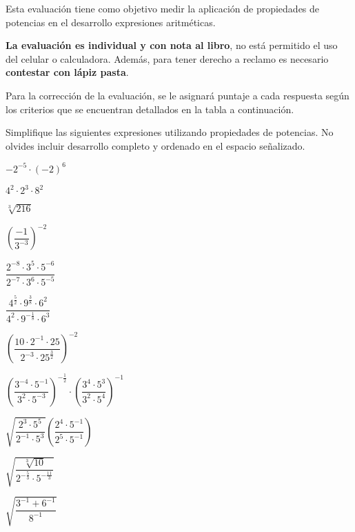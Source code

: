 \documentclass{caes}
\begin{document}
\datos
{}

Esta evaluación tiene como objetivo medir la aplicación de propiedades de 
potencias en el desarrollo expresiones aritméticas.  

{\bfseries La evaluación es individual y con nota al libro}, no está permitido 
el uso del celular o calculadora. Además, para tener derecho a 
reclamo es necesario {\bfseries contestar con lápiz pasta}.


Para la corrección de la evaluación, se le asignará puntaje a cada respuesta 
según los criterios que se encuentran detallados en la tabla a continuación.

\pauta

\parte Simplifique las siguientes expresiones utilizando propiedades de potencias. 
No olvides incluir desarrollo completo y ordenado en el espacio señalizado.

\pregunta $-2^{-5} \cdot (-2)^6$
\desarrollo[2.5cm]

\pregunta $4^2 \cdot 2^3 \cdot 8^2$
\desarrollo[2.5cm]

\pregunta $\sqrt[3]{216}$
\desarrollo[3cm]

\pregunta $\left(\dfrac{-1}{3^{-3}}\right)^{-2}$
\desarrollo[3cm]

\pregunta $\dfrac{2^{-8} \cdot 3^5 \cdot 5^{-6}}{2^{-7} \cdot 3^6 \cdot 5^{-5}}$
\desarrollo[3cm]

\pregunta $\dfrac{4^{\frac{5}{2}}\cdot 9^{\frac{3}{8}} \cdot 6^2}{4^2 \cdot 9^{-\frac{1}{8}} \cdot 6^3}$ 
\desarrollo[3cm]

\pregunta $\left(\dfrac{10\cdot 2^{-1} \cdot 25}{2^{-3} \cdot 25^{\frac{3}{2}}}\right)^{-2}$
\desarrollo[3cm]

\pregunta $\left(\dfrac{3^{-4}\cdot 5^{-1}}{3^2 \cdot 5^{-3}}\right)^{-\frac{1}{2}}\cdot\left(\dfrac{3^4 \cdot 5^3}{3^2 \cdot 5^4}\right)^{-1}$
\desarrollo[4cm]

\pregunta $\sqrt{\dfrac{2^3 \cdot 5^5}{2^{-1}\cdot 5^3}}\left(\dfrac{2^4\cdot 5^{-1}}{2^5 \cdot 5^{-1}}\right)$
\desarrollo[4cm]

\pregunta $\sqrt{\dfrac{\sqrt[3]{10}}{2^{-\frac{5}{3}}\cdot 5^{-\frac{11}{3}}}}$
\desarrollo[4cm]

\pregunta $\sqrt{\dfrac{3^{-1} + 6^{-1}}{8^{-1}}}$
\desarrollo[4cm]
\end{document}
